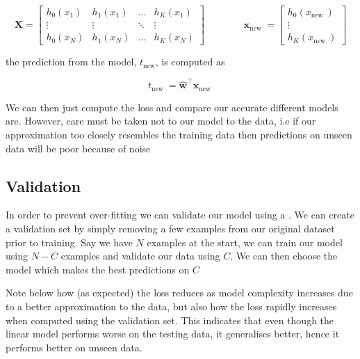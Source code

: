 		$$\mathbf{X}=\left[\begin{array}{cccc}h_{0}\left(x_{1}\right) & h_{1}\left(x_{1}\right) & \ldots & h_{K}\left(x_{1}\right) \\ \vdots & \vdots & \ddots & \vdots \\ h_{0}\left(x_{N}\right) & h_{1}\left(x_{N}\right) & \ldots & h_{K}\left(x_{N}\right)\end{array}\right] \qquad \qquad \mathbf{x}_{\text {new }}=\left[\begin{array}{c}h_{0}\left(x_{\text {new }}\right) \\ \vdots \\ h_{K}\left(x_{\text {new }}\right)\end{array}\right]$$

		\par{the prediction from the model, $t_{\text{new}}$, is computed as}
		
		$$t_{\text {new }}=\widehat{\mathbf{w}}^{\top} \mathbf{x}_{\text {new }}$$

		\par{We can then just compute the loss and compare our accurate different models are. However, care must be taken not to  our model to the data, i.e if our approximation too closely resembles the training data then predictions on unseen data will be poor because of noise}



		\subsection{Validation}


		\par{In order to prevent over-fitting we can validate our model using a . We can create a validation set by simply removing a few examples from our original dataset prior to training. Say we have $N$ examples at the start, we can train our model using $N-C$ examples and validate our data using $C$. We can then choose the model which makes the best predictions on $C$}

		\par{Note below how (as expected) the loss reduces as model complexity increases due to a better approximation to the data, but also how the loss rapidly increases when computed using the validation set. This indicates that even though the linear model performs worse on the testing data, it generalises better, hence it performs better on unseen data.}

